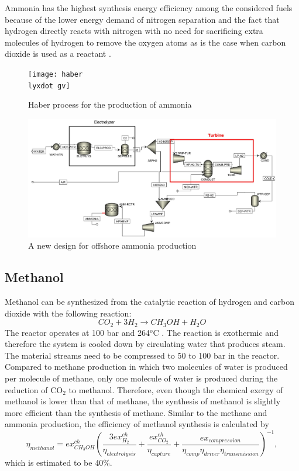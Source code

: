 \documentclass{ECOS_2021}
\begin{document}
Ammonia has the highest synthesis energy efficiency among the considered
fuels because of the lower energy demand of nitrogen separation and
the fact that hydrogen directly reacts with nitrogen with no need
for sacrificing extra molecules of hydrogen to remove the oxygen atoms
as is the case when carbon dioxide is used as a reactant \cite{elnashaieSimulationOptimizationIndustrial1988}.

\begin{figure}[H]
\texttt{[image: haber\\lyxdot gv]}

\caption{\label{fig:Haber-process}Haber process for the production of ammonia\cite{eftekhariQuantifyingRoleLiquid2020}}
\end{figure}

\begin{figure}[H]
\includegraphics[width=14cm]{ammonia_new_design}

\caption{\label{fig:ammonia-new-design}A new design for offshore ammonia production}
\end{figure}


\subsection{Methanol}

Methanol can be synthesized from the catalytic reaction of hydrogen
and carbon dioxide with the following reaction:
\begin{equation}
CO_{2}+3H_{2}\rightarrow CH_{3}OH+H_{2}O\label{eq:methanol}
\end{equation}
 The reactor operates at 100 bar and 264$^{o}$C \cite{luybenDesignControlMethanol2010}.
The reaction is exothermic and therefore the system is cooled down
by circulating water that produces steam. The material streams need
to be compressed to 50 to 100 bar in the reactor. Compared to methane
production in which two molecules of water is produced per molecule
of methane, only one molecule of water is produced during the reduction
of CO$_{2}$ to methanol. Therefore, even though the chemical exergy
of methanol is lower than that of methane, the synthesis of methanol
is slightly more efficient than the synthesis of methane. Similar
to the methane and ammonia production, the efficiency of methanol
synthesis is calculated by
\[
\eta_{methanol}=ex_{CH_{3}OH}^{ch}\left(\frac{3ex_{H_{2}}^{ch}}{\eta_{electrolysis}}+\frac{ex_{CO_{2}}^{ch}}{\eta_{capture}}+\frac{ex_{compression}}{\eta_{comp}\eta_{driver}\eta_{transmission}}\right)^{-1},
\]
which is estimated to be 40\%.
\end{document}
